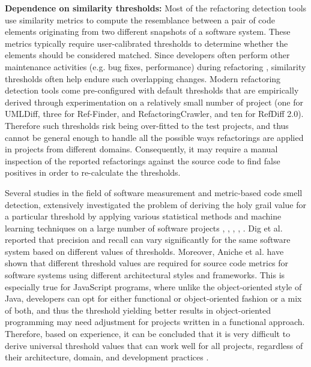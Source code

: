 \documentclass[letterpaper,12pt,onecolumn,final]{report}
\begin{document}
\textbf{Dependence on similarity thresholds:} Most of the refactoring detection tools use similarity metrics to compute the resemblance between a pair of code elements originating from two different snapshots of a software system. These metrics typically require user-calibrated thresholds to determine whether the elements should be considered matched. Since developers often perform other maintenance activities (e.g. bug fixes, performance) during refactoring \cite{MurphyHill2012}, similarity thresholds often help endure such overlapping changes. Modern refactoring detection tools come pre-configured with default thresholds that are empirically derived through experimentation on a relatively small number of project (one for UMLDiff, three for Ref-Finder, and RefactoringCrawler, and ten for RefDiff 2.0). Therefore such thresholds risk being over-fitted to the test projects, and thus cannot be general enough to handle all the possible ways refactorings are applied in projects from different domains. Consequently, it may require a manual inspection of the reported refactorings against the source code to find false positives in order to re-calculate the thresholds.

Several studies in the field of software measurement and metric-based code smell detection, extensively investigated the problem of deriving the holy grail value for a particular threshold by applying various statistical methods and machine learning techniques on a large number of software projects \cite{alves2010deriving}, \cite{ferreira2012identifying}, \cite{oliveira2014extracting}, \cite{fontana2015automatic}, \cite{fontana2016comparing}. Dig et al. \cite{dig2006automated} reported that precision and recall can vary significantly for the same software system based on different values of thresholds. Moreover, Aniche et al. \cite{aniche2016satt} have shown that different threshold values are required for source code metrics for software systems using different architectural styles and frameworks. This is especially true for JavaScript programs, where unlike the object-oriented style of Java, developers can opt for either functional or object-oriented fashion or a mix of both, and thus the threshold yielding better results in object-oriented programming may need adjustment for projects written in a functional approach. Therefore, based on experience, it can be concluded that it is very difficult to derive universal threshold values that can work well for all projects, regardless of their architecture, domain, and development practices \cite{Tsantalis2020}.
\end{document}
